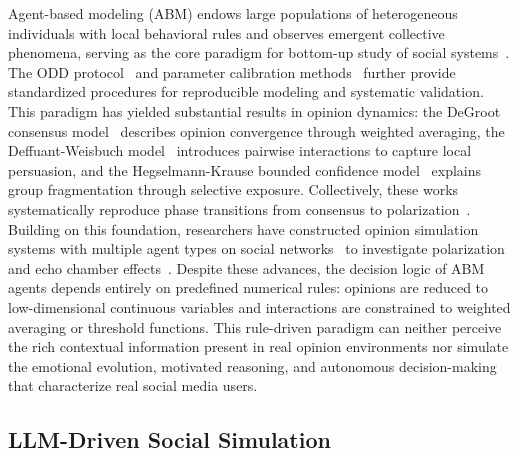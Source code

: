 \documentclass[a4paper,fleqn]{cas-dc}
\begin{document}
Agent-based modeling (ABM) endows large populations of heterogeneous individuals with local behavioral rules and observes emergent collective phenomena, serving as the core paradigm for bottom-up study of social systems~\citep{bonabeau_agent-based_2002,macal_tutorial_2010}. The ODD protocol~\citep{grimm_odd_2010} and parameter calibration methods~\citep{mcculloch_calibrating_2022} further provide standardized procedures for reproducible modeling and systematic validation. This paradigm has yielded substantial results in opinion dynamics: the DeGroot consensus model~\citep{degroot_reaching_1974} describes opinion convergence through weighted averaging, the Deffuant-Weisbuch model~\citep{deffuant_mixing_2000} introduces pairwise interactions to capture local persuasion, and the Hegselmann-Krause bounded confidence model~\citep{hegselmann_opinion_2002} explains group fragmentation through selective exposure. Collectively, these works systematically reproduce phase transitions from consensus to polarization~\citep{castellano_statistical_2009,bernardo_bc_survey_2024}. Building on this foundation, researchers have constructed opinion simulation systems with multiple agent types on social networks~\citep{chen_evolution_2025,wu_public_2023} to investigate polarization and echo chamber effects~\citep{liu_agent-based_2024,banisch_agent_2012,cinelli2021echo_ipm}. Despite these advances, the decision logic of ABM agents depends entirely on predefined numerical rules: opinions are reduced to low-dimensional continuous variables and interactions are constrained to weighted averaging or threshold functions. This rule-driven paradigm can neither perceive the rich contextual information present in real opinion environments nor simulate the emotional evolution, motivated reasoning, and autonomous decision-making that characterize real social media users.

\subsection{LLM-Driven Social Simulation}
\end{document}
